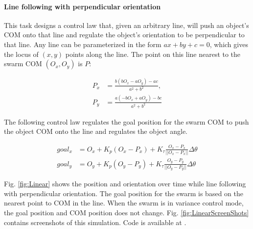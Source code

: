 \paragraph{Line following with perpendicular orientation} \label{para:PureTranslation}
This task designs a control law that, given an arbitrary line, will push an object's COM onto that line and regulate the object's orientation to be perpendicular to that line.
Any line can be parameterized in the form $ax+by+c =0$,  which gives the locus of $(x,y)$ points along the line.  The point on this line nearest to the swarm COM $(O_x,O_y)$ is $P$:


\begin{align}
P_x &= \frac{b(bO_x-aO_y)-ac}{a^2 + b^2},\\ \nonumber
P_y &= \frac{a(-bO_x+aO_y)-bc}{a^2 + b^2}
\end{align}


The following control law regulates the goal position for the swarm COM to push the object COM onto the line and regulates the object angle.

\begin{align}
goal_x &= O_x+ K_p (O_x-P_x)+ K_\tau \frac{O_x-P_x}{||O_x-P_x||}\Delta\theta \nonumber \\
goal_y &= O_y+ K_p (O_y-P_y)+ K_\tau \frac{O_y-P_y}{||O_y-P_y||}\Delta\theta \label{eq:Regulate}
\end{align}

Fig. \ref{fig:Linear} shows the position and orientation over time 
while line following with perpendicular orientation.
The goal position for the swarm is based on the nearest point to COM in the line.
 When the swarm is in variance control mode, the goal position and COM position does not change. Fig. \ref{fig:LinearScreenShots} contains screenshots of this simulation. Code is available at \cite{Shahrokhi16TorqueLine}.

